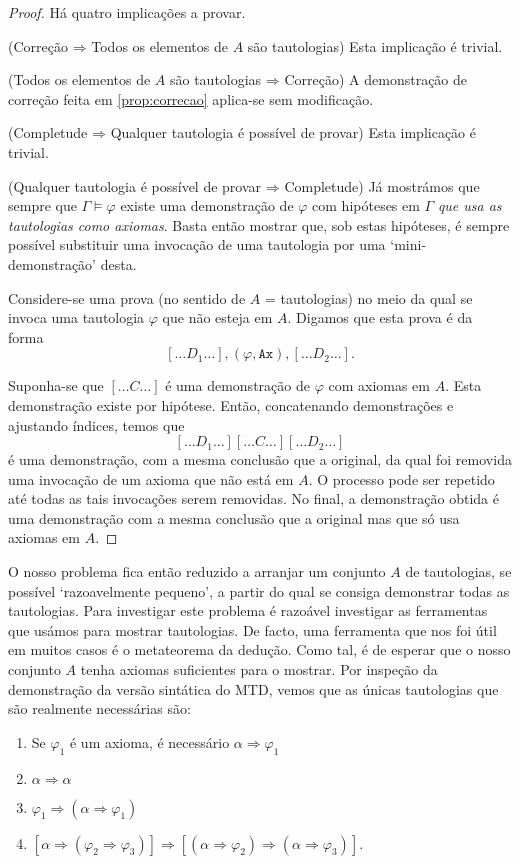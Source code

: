 \documentclass{report}
\theoremstyle{definition}
\theoremstyle{remark}
\newcommand{\imply}{\mathbin{\Rightarrow}}
\begin{document}
	\begin{proof}
	Há quatro implicações a provar.
	
	(Correção $\imply$ Todos os elementos de $A$ são tautologias) Esta implicação é trivial.
	
	(Todos os elementos de $A$ são tautologias $\imply$ Correção) A demonstração de correção feita em \ref{prop:correcao} aplica-se sem modificação.
	
	(Completude $\imply$ Qualquer tautologia é possível de provar) Esta implicação é trivial.
	
	(Qualquer tautologia é possível de provar $\imply$ Completude) Já mostrámos que sempre que $\Gamma \vDash \varphi$ existe uma demonstração de $\varphi$ com hipóteses em $\Gamma$ \emph{que usa as tautologias como axiomas}. Basta então mostrar que, sob estas hipóteses, é sempre possível substituir uma invocação de uma tautologia por uma `mini-demonstração' desta.
	
	Considere-se uma prova (no sentido de $A$ = tautologias) no meio da qual se invoca uma tautologia $\varphi$ que não esteja em $A$. Digamos que esta prova é da forma
	\[ [\dots D_1 \dots], (\varphi, \texttt{Ax}), [\dots D_2 \dots].\]
	
	Suponha-se que $[\dots C \dots]$ é uma demonstração de $\varphi$ com axiomas em $A$. Esta demonstração existe por hipótese. Então, concatenando demonstrações e ajustando índices, temos que
	\[ [\dots D_1 \dots] [\dots C \dots] [\dots D_2 \dots] \]
	é uma demonstração, com a mesma conclusão que a original, da qual foi removida uma invocação de um axioma que não está em $A$. O processo pode ser repetido até todas as tais invocações serem removidas. No final, a demonstração obtida é uma demonstração com a mesma conclusão que a original mas que só usa axiomas em $A$.
	\end{proof}
	
	O nosso problema fica então reduzido a arranjar um conjunto $A$ de tautologias, se possível `razoavelmente pequeno', a partir do qual se consiga demonstrar todas as tautologias. Para investigar este problema é razoável investigar as ferramentas que usámos para mostrar tautologias. De facto, uma ferramenta que nos foi útil em muitos casos é o metateorema da dedução. Como tal, é de esperar que o nosso conjunto $A$ tenha axiomas suficientes para o mostrar. Por inspeção da demonstração da versão sintática do MTD, vemos que as únicas tautologias que são realmente necessárias são:
	
	\begin{enumerate}
	\item Se $\varphi_1$ é um axioma, é necessário $\alpha \imply \varphi_1$
	
	\item $\alpha \imply \alpha$
	
	\item $\varphi_1 \imply (\alpha \imply \varphi_1)$
	
	\item $[\alpha \imply (\varphi_2 \imply \varphi_3)] \imply [(\alpha \imply \varphi_2) \imply (\alpha \imply \varphi_3)]$.
	\end{enumerate}
	
\end{document}
